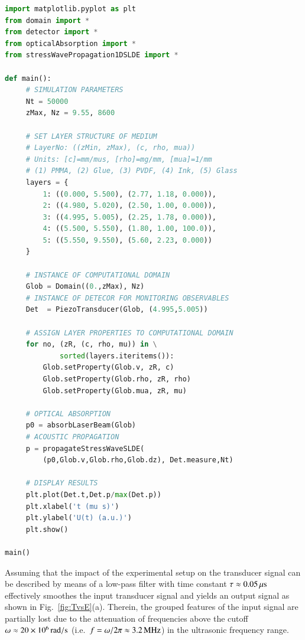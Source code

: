 \documentclass[5p,times,twocolumn]{elsarticle}
\begin{document}
\begin{lstlisting}[float,captionpos=b, keywordstyle=\bf, frame=lines, language=Python,basicstyle=\ttfamily\scriptsize, 
caption={Implementation of the examplary application discussed in the sec.\
\ref{sec:S3}, contained in {\tt{python}} script file
{\tt{main\_InkOnGlass\_Fig2a.py}}.  Given that the imported modules are in the
local searchpath, the script produces output similar to Fig.\,
\ref{fig:pzt}(a)}, label=code:numExp]
import matplotlib.pyplot as plt
from domain import *
from detector import *
from opticalAbsorption import *
from stressWavePropagation1DSLDE import *

def main():
     # SIMULATION PARAMETERS 
     Nt = 50000
     zMax, Nz = 9.55, 8600        

     # SET LAYER STRUCTURE OF MEDIUM
     # LayerNo: ((zMin, zMax), (c, rho, mua))
     # Units: [c]=mm/mus, [rho]=mg/mm, [mua]=1/mm
     # (1) PMMA, (2) Glue, (3) PVDF, (4) Ink, (5) Glass
     layers = {
         1: ((0.000, 5.500), (2.77, 1.18, 0.000)), 
         2: ((4.980, 5.020), (2.50, 1.00, 0.000)), 
         3: ((4.995, 5.005), (2.25, 1.78, 0.000)), 
         4: ((5.500, 5.550), (1.80, 1.00, 100.0)), 
         5: ((5.550, 9.550), (5.60, 2.23, 0.000))  
     }

     # INSTANCE OF COMPUTATIONAL DOMAIN
     Glob = Domain((0.,zMax), Nz)
     # INSTANCE OF DETECOR FOR MONITORING OBSERVABLES
     Det  = PiezoTransducer(Glob, (4.995,5.005))

     # ASSIGN LAYER PROPERTIES TO COMPUTATIONAL DOMAIN
     for no, (zR, (c, rho, mu)) in \
             sorted(layers.iteritems()):
         Glob.setProperty(Glob.v, zR, c) 
         Glob.setProperty(Glob.rho, zR, rho)                 
         Glob.setProperty(Glob.mua, zR, mu)
     
     # OPTICAL ABSORPTION
     p0 = absorbLaserBeam(Glob)
     # ACOUSTIC PROPAGATION
     p = propagateStressWaveSLDE(
         (p0,Glob.v,Glob.rho,Glob.dz), Det.measure,Nt)

     # DISPLAY RESULTS 
     plt.plot(Det.t,Det.p/max(Det.p))
     plt.xlabel('t (mu s)')
     plt.ylabel('U(t) (a.u.)')
     plt.show()

main()
\end{lstlisting}


Assuming that the impact of the experimental setup on the transducer signal can
be described by means of a low-pass filter with time constant $\tau \approx
0.05\,{\rm{\mu s}}$ effectively smoothes the input transducer signal and yields
an output signal as shown in Fig.\ \ref{fig:TvsE}(a). Therein, the grouped
features of the input signal are partially lost due to the attenuation of
frequencies above the cutoff $\omega \approx 20 \times 10^6\,{\rm{rad/s}}$ (i.e.\ $f =
\omega/ 2 \pi\approx 3.2\,{\rm{MHz}}$) in the ultrasonic frequency range.
\end{document}
